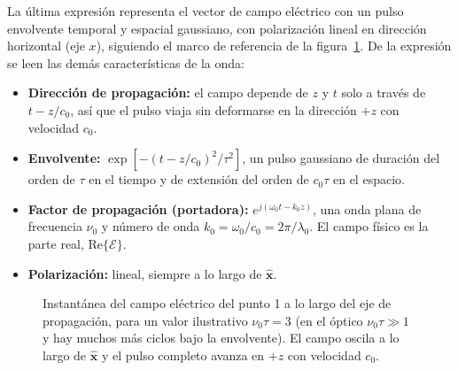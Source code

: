 \documentclass{article}
\newcommand{\Ec}{\boldsymbol{\mathcal{E}}}
\newcommand{\xh}{\hat{\mathbf{x}}}
\begin{document}
La última expresión representa el vector de campo eléctrico con un pulso envolvente temporal y
espacial gaussiano, con polarización lineal en dirección horizontal (eje $x$), siguiendo el
marco de referencia de la figura~\ref{fig:p1}. De la expresión se leen las demás características
de la onda:
\begin{itemize}
  \item \textbf{Dirección de propagación:} el campo depende de $z$ y $t$ solo a través de
  $t-z/c_0$, así que el pulso viaja sin deformarse en la dirección $+z$ con velocidad $c_0$.
  \item \textbf{Envolvente:} $\exp[-(t-z/c_0)^2/\tau^2]$, un pulso gaussiano de duración del
  orden de $\tau$ en el tiempo y de extensión del orden de $c_0\tau$ en el espacio.
  \item \textbf{Factor de propagación (portadora):} $e^{j(\omega_0t-k_0z)}$, una onda plana de
  frecuencia $\nu_0$ y número de onda $k_0=\omega_0/c_0=2\pi/\lambda_0$. El campo físico es la
  parte real, $\mathrm{Re}\{\Ec\}$.
  \item \textbf{Polarización:} lineal, siempre a lo largo de $\xh$.
\end{itemize}

\begin{figure}[H]
\centering
{}
\caption{Instantánea del campo eléctrico del punto 1 a lo largo del eje de propagación, para un
valor ilustrativo $\nu_0\tau=3$ (en el óptico $\nu_0\tau\gg1$ y hay muchos más ciclos bajo la
envolvente). El campo oscila a lo largo de $\hat{\mathbf x}$ y el pulso completo avanza en $+z$ con
velocidad $c_0$.}
\label{fig:p1}
\end{figure}
\end{document}
